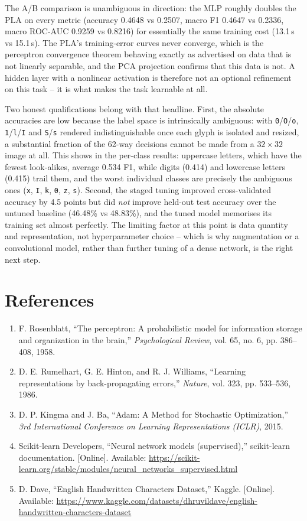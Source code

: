 \documentclass[12pt,a4paper]{article}
\DeclareRobustCommand{\_}{\textunderscore\allowbreak}
\begin{document}
The A/B comparison is unambiguous in direction: the MLP roughly doubles the
PLA on every metric (accuracy 0.4648 vs 0.2507, macro F1 0.4647 vs 0.2336,
macro ROC-AUC 0.9259 vs 0.8216) for essentially the same training cost (13.1\,s
vs 15.1\,s). The PLA's training-error curves never converge, which is the
perceptron convergence theorem behaving exactly as advertised on data that is
not linearly separable, and the PCA projection confirms that this data is not.
A hidden layer with a nonlinear activation is therefore not an optional
refinement on this task -- it is what makes the task learnable at all.

Two honest qualifications belong with that headline. First, the absolute
accuracies are low because the label space is intrinsically ambiguous: with
\texttt{0}/\texttt{O}/\texttt{o}, \texttt{1}/\texttt{l}/\texttt{I} and
\texttt{S}/\texttt{s} rendered indistinguishable once each glyph is isolated
and resized, a substantial fraction of the 62-way decisions cannot be made
from a $32\times32$ image at all. This shows in the per-class results:
uppercase letters, which have the fewest look-alikes, average 0.534 F1, while
digits (0.414) and lowercase letters (0.415) trail them, and the worst
individual classes are precisely the ambiguous ones (\texttt{x},
\texttt{I}, \texttt{k}, \texttt{0}, \texttt{z}, \texttt{s}). Second, the
staged tuning improved cross-validated accuracy by 4.5 points but did
\emph{not} improve held-out test accuracy over the untuned baseline
(46.48\% vs 48.83\%), and the tuned model memorises its training set almost
perfectly. The limiting factor at this point is data quantity and
representation, not hyperparameter choice -- which is why augmentation or a
convolutional model, rather than further tuning of a dense network, is the
right next step.

\section{References}
\begin{enumerate}[nosep]
\item F. Rosenblatt, ``The perceptron: A probabilistic model for information
storage and organization in the brain,'' \emph{Psychological Review}, vol. 65,
no. 6, pp. 386--408, 1958.
\item D. E. Rumelhart, G. E. Hinton, and R. J. Williams, ``Learning
representations by back-propagating errors,'' \emph{Nature}, vol. 323,
pp. 533--536, 1986.
\item D. P. Kingma and J. Ba, ``Adam: A Method for Stochastic Optimization,''
\emph{3rd International Conference on Learning Representations (ICLR)}, 2015.
\item Scikit-learn Developers, ``Neural network models (supervised),''
scikit-learn documentation. [Online]. Available:
\url{https://scikit-learn.org/stable/modules/neural_networks_supervised.html}
\item D. Dave, ``English Handwritten Characters Dataset,'' Kaggle. [Online].
Available: \url{https://www.kaggle.com/datasets/dhruvildave/english-handwritten-characters-dataset}
\end{enumerate}
\end{document}

